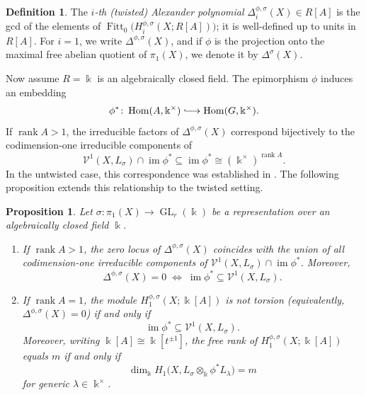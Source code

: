 \documentclass[11pt]{amsart}
\newtheorem{proposition}[theorem]{Proposition}
\theoremstyle{definition}
\newtheorem{definition}[theorem]{Definition}
\renewcommand{\k}{\Bbbk}
\newcommand{\VV}{\mathcal{V}}
\DeclareMathOperator{\rank}{rank}
\DeclareMathOperator{\im}{im}
\DeclareMathOperator{\GL}{GL}
\DeclareMathOperator{\Hom}{{Hom}}
\DeclareMathOperator{\Fitt}{{Fitt}}
\newcommand{\longinj}{\lhook\joinrel\longrightarrow}
\begin{document}
\begin{definition}
\label{def:twist-alex-poly}
The \emph{$i$-th (twisted) Alexander polynomial} $\Delta_i^{\phi,\sigma}(X)\in R[A]$ 
is the gcd of the elements of $\Fitt_0\!\bigl(H_i^{\phi,\sigma}(X;R[A])\bigr)$;
it is well-defined up to units in $R[A]$.
For $i=1$, we write $\Delta^{\phi,\sigma}(X)$, and if $\phi$ is the projection 
onto the maximal free abelian quotient of $\pi_1(X)$, we denote it by 
$\Delta^\sigma(X)$.
\end{definition}

Now assume $R=\k$ is an algebraically closed field. The epimorphism $\phi$ 
induces an embedding
\[
\phi^* \colon \Hom(A,\k^{\times}) \longinj \Hom(G,\k^{\times}).
\]
If $\rank A>1$, the irreducible factors of $\Delta^{\phi,\sigma}(X)$ correspond 
bijectively to the codimension-one irreducible components of
\[
\VV^1(X,L_\sigma) \cap \im \phi^*
\subseteq \im \phi^* \cong (\k^\times)^{\rank A}.
\]
In the untwisted case, this correspondence was established in \cite[Cor.~3.2]{DPS-imrn}. 
The following proposition extends this relationship to the twisted setting.

\begin{proposition} 
\label{prop:jump-loci-and-Alexander}
Let $\sigma\colon \pi_1(X)\to \GL_r(\k)$ be a representation over an 
algebraically closed field $\k$.
\begin{enumerate}
\item \label{ja1}
If $\rank A>1$, the zero locus of $\Delta^{\phi,\sigma}(X)$ coincides with the 
union of all codimension-one irreducible components of 
$\VV^1(X,L_\sigma) \cap \im \phi^*$. Moreover,
\[
\Delta^{\phi,\sigma}(X)=0 \;\Longleftrightarrow\; 
\im \phi^* \subseteq \VV^1(X,L_\sigma).
\]

\item \label{ja2}
If $\rank A=1$, the module $H_1^{\phi,\sigma}(X;\k[A])$ is not torsion 
(equivalently, $\Delta^{\phi,\sigma}(X)=0$) if and only if 
\[
\im \phi^* \subseteq \VV^1(X,L_\sigma).
\]
Moreover, writing $\k[A]\cong \k[t^{\pm1}]$, the free rank of 
$H_1^{\phi,\sigma}(X;\k[A])$ equals $m$ if and only if 
\[
\dim_\k H_1\bigl(X, L_\sigma \otimes_{\k} \phi^* L_\lambda\bigr)=m
\]
for generic $\lambda\in \k^\times$.
\end{enumerate}
\end{proposition}
\end{document}

